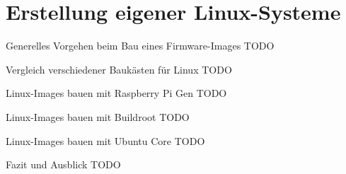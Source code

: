 \section{Erstellung eigener Linux-Systeme}

\begin{frame}{Generelles Vorgehen beim Bau eines Firmware-Images}
    TODO
\end{frame}

\begin{frame}{Vergleich verschiedener Baukästen für Linux}
    TODO
\end{frame}

\begin{frame}{Linux-Images bauen mit Raspberry Pi Gen}
    TODO
\end{frame}

\begin{frame}{Linux-Images bauen mit Buildroot}
    TODO
\end{frame}

\begin{frame}{Linux-Images bauen mit Ubuntu Core}
    TODO
\end{frame}

\begin{frame}{Fazit und Ausblick}
    TODO
\end{frame}

